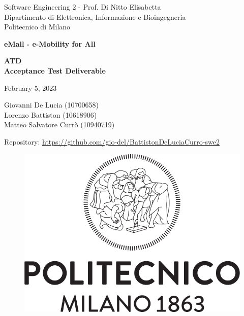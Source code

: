 \documentclass{article}
\begin{document}
\begin{titlepage}
    \centering
    {\normalsize
        Software Engineering 2 - Prof. Di Nitto Elisabetta \\
        Dipartimento di Elettronica, Informazione e Bioingegneria \\
        Politecnico di Milano \par
    }     \vspace{3cm}
    {\Huge \textbf{eMall - e-Mobility for All\\} } \vspace{1cm}
    {\large \textbf{ATD\\Acceptance Test Deliverable} \par} \vspace{1cm}
    {\normalsize February 5, 2023 \par} \vspace{4cm}
    {\normalsize Giovanni De Lucia (10700658) \\ Lorenzo Battiston (10618906) \\  Matteo Salvatore Currò (10940719)\par} \vspace{0.5cm}
    {Repository: \url{https://github.com/gio-del/BattistonDeLuciaCurro-swe2}} \vspace{4cm}
    \begin{figure}[h]
        \centering
        \includegraphics[scale=0.3]{src/Logo_Politecnico_Milano.png}
    \end{figure} \vspace{0.5cm}
\end{titlepage}
\end{document}
